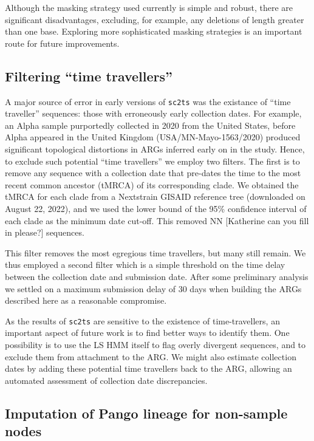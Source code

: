 \documentclass{article}
\begin{document}
Although the masking strategy used currently is simple and robust,
there are significant disadvantages, excluding, for example, any
deletions of length greater than one base. Exploring more sophisticated
masking strategies is an important route for future improvements.

\subsection{Filtering ``time travellers''}
\label{sec:filtering_time_travellers}
A major source of error in early versions of \texttt{sc2ts} was
the existance of ``time traveller'' sequences: those with erroneously
early collection dates.
For example, an Alpha sample purportedly collected in 2020 from the United States,
before Alpha appeared in the United Kingdom (USA/MN-Mayo-1563/2020)
produced significant topological distortions in
ARGs inferred early on in the study.
Hence, to exclude such potential ``time travellers'' we employ two filters.
The first is to remove any sequence with a collection date that pre-dates the
time to the most recent common ancestor (tMRCA) of its corresponding clade.
We obtained the tMRCA for each clade from a Nextstrain GISAID reference tree
(downloaded on August 22, 2022), and we used the lower bound of the 95\%
confidence interval of each clade as the minimum date cut-off.
This removed NN [Katherine can you fill in please?] sequences.

This filter removes the most egregious time travellers, but many still
remain. We thus employed a second filter which is a simple threshold on
the time delay between the collection date and submission date.
After some preliminary analysis we settled on a maximum submission delay
of 30 days when building the ARGs described here as a reasonable compromise.

As the results of \texttt{sc2ts} are sensitive to the existence of
time-travellers, an important aspect of future work is to find better ways
to identify them. One possibility is to use the LS HMM itself to flag
overly divergent sequences, and to exclude them from attachment to the ARG.
We might also estimate collection dates by adding these potential time travellers
back to the ARG, allowing an automated assessment of collection date discrepancies.

\subsection{Imputation of Pango lineage for non-sample nodes}
\end{document}
